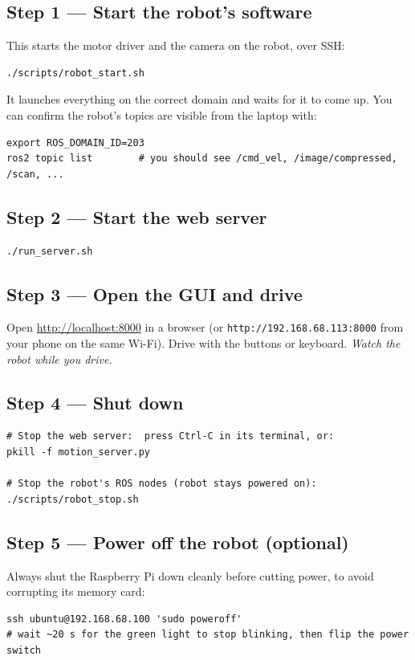 \documentclass[11pt,a4paper]{article}
\newcommand{\code}[1]{\texttt{#1}}
\begin{document}
\subsection{Step 1 --- Start the robot's software}
This starts the motor driver and the camera on the robot, over SSH:
\begin{lstlisting}[style=bash]
./scripts/robot_start.sh
\end{lstlisting}
It launches everything on the correct domain and waits for it to come up. You can
confirm the robot's topics are visible from the laptop with:
\begin{lstlisting}[style=bash]
export ROS_DOMAIN_ID=203
ros2 topic list        # you should see /cmd_vel, /image/compressed, /scan, ...
\end{lstlisting}

\subsection{Step 2 --- Start the web server}
\begin{lstlisting}[style=bash]
./run_server.sh
\end{lstlisting}

\subsection{Step 3 --- Open the GUI and drive}
Open \url{http://localhost:8000} in a browser (or
\code{http://192.168.68.113:8000} from your phone on the same Wi-Fi). Drive with
the buttons or keyboard. \emph{Watch the robot while you drive.}

\subsection{Step 4 --- Shut down}
\begin{lstlisting}[style=bash]
# Stop the web server:  press Ctrl-C in its terminal, or:
pkill -f motion_server.py

# Stop the robot's ROS nodes (robot stays powered on):
./scripts/robot_stop.sh
\end{lstlisting}

\subsection{Step 5 --- Power off the robot (optional)}
Always shut the Raspberry Pi down cleanly before cutting power, to avoid
corrupting its memory card:
\begin{lstlisting}[style=bash]
ssh ubuntu@192.168.68.100 'sudo poweroff'
# wait ~20 s for the green light to stop blinking, then flip the power switch
\end{lstlisting}
\end{document}
